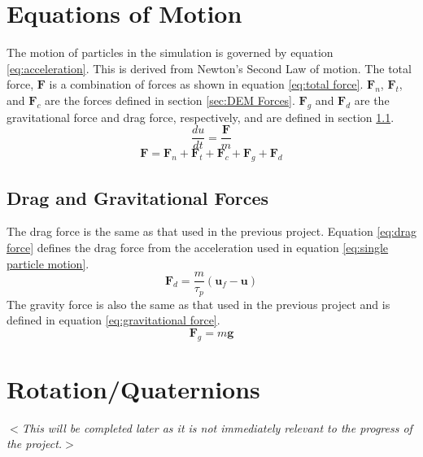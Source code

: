 \documentclass[10pt,a4paper,titlepage]{report}
\begin{document}
\section{Equations of Motion}
The motion of particles in the simulation is governed by equation \ref{eq:acceleration}. This is derived from Newton's Second Law of motion. The total force, $\mathbf{F}$ is a combination of forces as shown in equation \ref{eq:total force}. $\mathbf{F}_{n}$, $\mathbf{F}_{t}$, and $\mathbf{F}_{c}$ are the forces defined in section \ref{sec:DEM Forces}. $\mathbf{F}_{g}$ and $\mathbf{F}_{d}$ are the gravitational force and drag force, respectively, and are defined in section \ref{sec:drag and gravity}.
\begin{equation}
\dfrac{du}{dt} = \dfrac{\mathbf{F}}{m}
\label{eq:acceleration}
\end{equation}
\begin{equation}
\mathbf{F} = \mathbf{F}_{n} + \mathbf{F}_{t} + \mathbf{F}_{c} + \mathbf{F}_{g} + \mathbf{F}_{d}
\label{eq:total force}
\end{equation}
\subsection{Drag and Gravitational Forces}
\label{sec:drag and gravity}
The drag force is the same as that used in the previous project. Equation \ref{eq:drag force} defines the drag force from the acceleration used in equation \ref{eq:single particle motion}.
\begin{equation}
\label{eq:drag force}
\mathbf{F}_{d} = \dfrac{m}{\tau_p} (\mathbf{u}_f - \mathbf{u})
\end{equation}
The gravity force is also the same as that used in the previous project and is defined in equation \ref{eq:gravitational force}.
\begin{equation}
\label{eq:gravitational force}
\mathbf{F}_{g} = m \mathbf{g}
\end{equation}
\section{Rotation/Quaternions}
\textit{$<$This will be completed later as it is not immediately relevant to the progress of the project.$>$}
\end{document}
